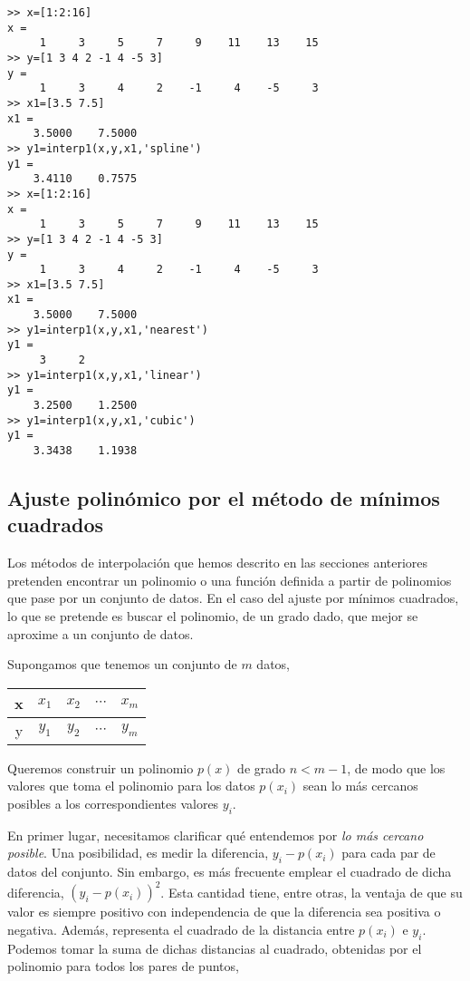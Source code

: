 \begin{verbatim}
>> x=[1:2:16]
x =
     1     3     5     7     9    11    13    15
>> y=[1 3 4 2 -1 4 -5 3]
y =
     1     3     4     2    -1     4    -5     3
>> x1=[3.5 7.5]
x1 =
    3.5000    7.5000
>> y1=interp1(x,y,x1,'spline')
y1 =
    3.4110    0.7575
>> x=[1:2:16]
x =
     1     3     5     7     9    11    13    15
>> y=[1 3 4 2 -1 4 -5 3]
y =
     1     3     4     2    -1     4    -5     3
>> x1=[3.5 7.5]
x1 =
    3.5000    7.5000
>> y1=interp1(x,y,x1,'nearest')
y1 =
     3     2
>> y1=interp1(x,y,x1,'linear')
y1 =
    3.2500    1.2500
>> y1=interp1(x,y,x1,'cubic')
y1 =
    3.3438    1.1938
\end{verbatim}
\begin{paracol}{2}
\section{Ajuste polinómico por el método de mínimos cuadrados}\label{sec:mc} 
Los métodos de interpolación que hemos descrito en las secciones anteriores pretenden encontrar un polinomio o una función definida a partir de polinomios que pase por un conjunto de datos. En el caso del ajuste por mínimos cuadrados, lo que se pretende es buscar el polinomio, de un grado dado, que mejor se aproxime a un conjunto de datos.

Supongamos que tenemos un conjunto de $m$ datos, 
\end{paracol}
\begin{table}[h]
\centering
\begin{tabular}{c|cccc}
x&$x_1$&$x_2$&$\cdots$&$x_m$\\
\hline
y&$y_1$&$y_2$&$\cdots$&$y_m$
\end{tabular}
\end{table} 
\begin{paracol}{2}
Queremos construir un polinomio $p(x)$  de grado $n < m-1$, de modo que los valores que toma el polinomio para los datos $p(x_i)$ sean lo más cercanos posibles a los correspondientes valores $y_i$. 

En primer lugar, necesitamos clarificar qué entendemos por \emph{lo más cercano posible}.  Una posibilidad, es medir la diferencia, $y_i-p(x_i)$ para cada par de datos del conjunto. Sin embargo, es más frecuente emplear el cuadrado de dicha diferencia, $\left(y_i-p(x_i)\right)^2$. Esta cantidad tiene, entre otras, la ventaja de que su valor es siempre positivo con  independencia de que la diferencia sea positiva o negativa. Además, representa el cuadrado de la distancia entre $p(x_i)$ e $y_i$. Podemos tomar la suma de dichas distancias al cuadrado, obtenidas por el polinomio para todos los pares de puntos, 
\end{paracol}
